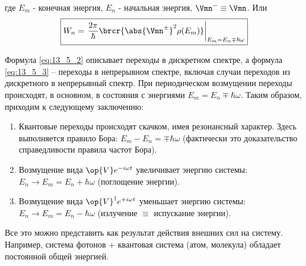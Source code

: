 где $E_m$ - конечная энергия, $E_n$ - начальная энергия, $\Vmn^- \equiv \Vmn$. Или
\begin{equation}
\label{eq:13_5_3}
\boxed{W_n = \left .\frac{2\pi}{\hbar} \brcr{\abs{\Vmn^\pm}^2 \rho(E_m)} \right |_{E_m = E_n \mp \hbar \omega}} 
\end{equation}

Формула \eqref{eq:13_5_2} описывает переходы в дискретном спектре, а формула \eqref{eq:13_5_3} -- переходы в непрерывном спектре, включая случаи переходов из дискретного в непрерывный спектр. При периодическом возмущении переходы происходят, в основном, в состояния с энергиями $E_m = E_n \mp \hbar \omega$. Таким образом, приходим к следующему заключению:
\begin{enumerate}
\item Квантовые переходы происходят скачком, имея резонансный характер. Здесь выполняется правило Бора: $E_m - E_n = \mp \hbar \omega$ (фактически это доказательство справедливости правила частот Бора).

\item Возмущение вида $\op{V} e^{-i \omega t}$ увеличивает энергию системы: $E_n \to E_m = E_n + \hbar \omega$ (поглощение энергии).

\item Возмущение вида $\op{V}^\dag e^{+i \omega t}$ уменьшает энергию системы: $E_n \to E_m = E_n - \hbar \omega$ (излучение $\equiv$ испускание энергии).
\end{enumerate}

Все это можно представить как результат действия внешних сил на систему. Например, система фотонов + квантовая система (атом, молекула) обладает постоянной общей энергией.
